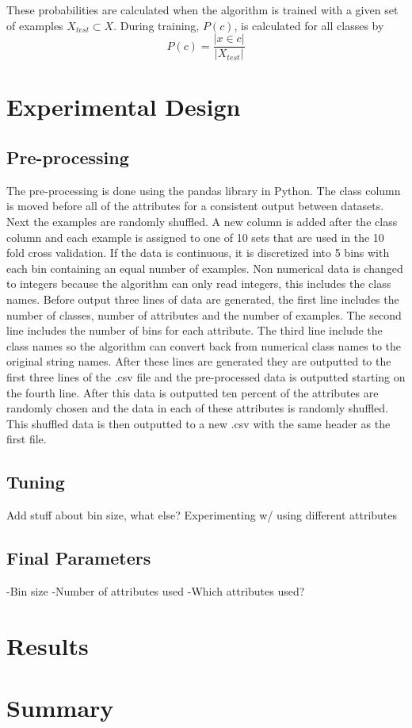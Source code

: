 \documentclass[twoside,11pt]{article}
\begin{document}
These probabilities are calculated when the algorithm is trained with a given set of examples $X_{test} \subset X$. During training, $P(c)$, is calculated for all classes by
$$P(c) = \frac{|x \in c|}{|X_{test}|}$$ 

\section{Experimental Design}

\subsection{Pre-processing}

The pre-processing is done using the pandas library in Python. The class column is moved before all of the attributes for a consistent output between datasets. Next the examples are randomly shuffled. A new column is added after the class column and each example is assigned to one of 10 sets that are used in the 10 fold cross validation. If the data is continuous, it is discretized into 5 bins with each bin containing an equal number of examples. Non numerical data is changed to integers because the algorithm can only read integers, this includes the class names. Before output three lines of data are generated, the first line includes the number of classes, number of attributes and the number of examples. The second line includes the number of bins for each attribute. The third line include the class names so the algorithm can convert back from numerical class names to the original string names. After these lines are generated they are outputted to the first three lines of the .csv file and the pre-processed data is outputted starting on the fourth line. After this data is outputted ten percent of the attributes are randomly chosen and the data in each of these attributes is randomly shuffled. This shuffled data is then outputted to a new .csv with the same header as the first file.  

\subsection{Tuning}

Add stuff about bin size, what else? \newline
Experimenting w/ using different attributes

\subsection{Final Parameters}

-Bin size \newline
-Number of attributes used \newline
-Which attributes used? \newline

\section{Results}

\section{Summary}


\end{document}
